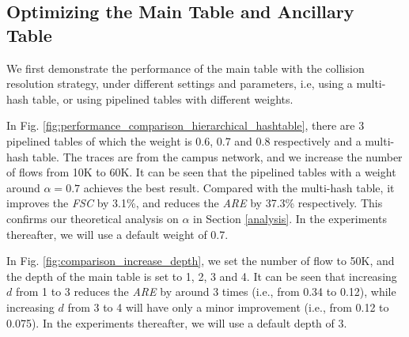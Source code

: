 \subsection{Optimizing the Main Table and Ancillary Table }
We first demonstrate the performance of the main table with the collision resolution strategy, 
under different settings and parameters, i.e, using a multi-hash table, 
or using pipelined tables with different weights.

In Fig. \ref{fig:performance_comparison_hierarchical_hashtable}, there are 3 pipelined tables of which the weight is 0.6, 0.7 and 0.8 respectively and a multi-hash table. 
The traces are from  the campus network, and we increase the number of flows from 10K to 60K.
It can be seen that the pipelined tables with a weight around $\alpha=0.7$ achieves the best result.
Compared with the multi-hash table, it improves the \emph{FSC} by 3.1\%, 
and reduces the \emph{ARE} by 37.3\% respectively. 
This confirms our theoretical analysis on $\alpha$ in Section \ref{analysis}.
In the experiments thereafter, we will use a default weight of 0.7.


In Fig. \ref{fig:comparison_increase_depth}, we set the number of flow to 50K, and the depth of the main table is set to 1, 2, 3 and 4.
It can be seen that increasing $d$ from 1 to 3 reduces the \emph{ARE} by around 3 times (i.e., from 0.34 to 0.12), 
while increasing $d$ from 3 to 4 will have only a minor improvement (i.e., from 0.12 to 0.075). 
In the experiments thereafter, we will use a default depth of 3.



